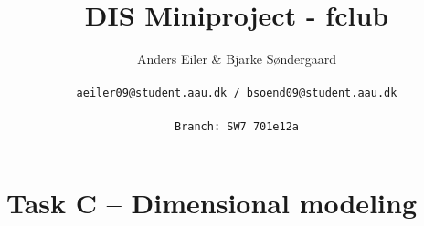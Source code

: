 \documentclass[a4paper,10pt]{article}
\title{DIS Miniproject - fclub}
\author{Anders Eiler \& Bjarke Søndergaard \\
\rule{0pt}{4ex}\texttt{aeiler09@student.aau.dk / bsoend09@student.aau.dk} \\
\rule{0pt}{4ex}\texttt{Branch: SW7 701e12a}}
\begin{document}
    \maketitle
    \newpage



    \section{Task C – Dimensional modeling}
    



\end{document}
